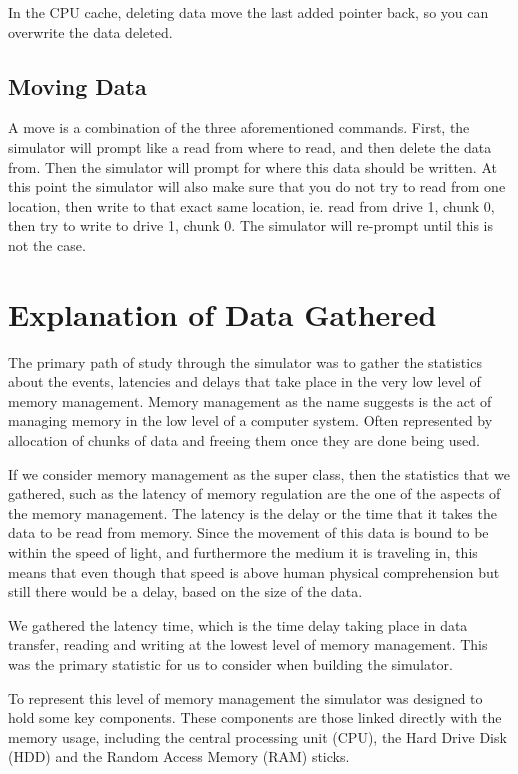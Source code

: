 \documentclass[12pt]{article}
\begin{document}
In the CPU cache, deleting data move the last added pointer back, so you can overwrite the data
deleted.

\subsection*{Moving Data}
A move is a combination of the three aforementioned commands. First, the simulator will prompt
like a read from where to read, and then delete the data from. Then the simulator will prompt
for where this data should be written. At this point the simulator will also make sure that
you do not try to read from one location, then write to that exact same location, ie. read
from drive 1, chunk 0, then try to write to drive 1, chunk 0. The simulator will re-prompt until
this is not the case. 
\section{Explanation of Data Gathered}
\label{sec:expstats}


The primary path of study through the simulator was to gather the statistics about the
events, latencies and delays that take place in the very low level of memory management.
Memory management as the name suggests is the act of managing memory in the low level of
a computer system. Often represented by allocation of chunks of data and freeing them once they are
done being used.

If we consider memory management as the super class, then the statistics that we gathered, such
as the latency of memory regulation are the one of the aspects of the memory management.
The latency is the delay or the time that it takes the data to be read from memory.
Since the movement of this data is bound to be within the speed of light, and furthermore
the medium it is traveling in, this means that even though that speed is above human physical
comprehension but still there would be a delay, based on the size of the data.

We gathered the latency time, which is the time delay taking place in data transfer, reading and
writing at the lowest level of memory management. This was the primary statistic for us to consider
when building the simulator.

To represent this level of memory management the simulator was designed to hold some key components.
These components are those linked directly with the memory usage, including the
central processing unit (CPU), the Hard Drive Disk (HDD) and the Random Access Memory (RAM) sticks.
\end{document}

